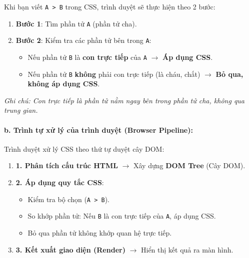 \documentclass[11pt,oneside]{book}
\newcommand{\codeinline}[1]{\textcolor{accentOrange}{\texttt{#1}}}
\newcommand{\term}[1]{\textbf{\textcolor{primaryBlue}{#1}}}
\begin{document}
\begin{noteBox}
Khi bạn viết \codeinline{A > B} trong CSS, trình duyệt sẽ thực hiện theo 2 bước:
\begin{enumerate}[leftmargin=1.5em, itemsep=3pt, parsep=0pt]
    \item \textbf{Bước 1}: Tìm phần tử \codeinline{A} (phần tử cha).
    \item \textbf{Bước 2}: Kiểm tra các phần tử bên trong \codeinline{A}:
    \begin{itemize}[leftmargin=1.2em, itemsep=2pt, parsep=0pt]
        \item Nếu phần tử \codeinline{B} là \textbf{con trực tiếp} của \codeinline{A} $\rightarrow$ \textcolor{tipBorder}{\textbf{Áp dụng CSS}}.
        \item Nếu phần tử \codeinline{B} \textbf{không} phải con trực tiếp (là cháu, chắt) $\rightarrow$ \textcolor{warnBorder}{\textbf{Bỏ qua, không áp dụng CSS}}.
    \end{itemize}
\end{enumerate}
\textit{Ghi chú: Con trực tiếp là phần tử nằm ngay bên trong phần tử cha, không qua trung gian.}
\end{noteBox}

\paragraph{b. Trình tự xử lý của trình duyệt (Browser Pipeline):}

\begin{conceptBox}
Trình duyệt xử lý CSS theo thứ tự duyệt cây DOM:
\begin{enumerate}[leftmargin=1.5em, itemsep=3pt, parsep=0pt]
    \item \textbf{1. Phân tích cấu trúc HTML} $\rightarrow$ Xây dựng \term{DOM Tree} (Cây DOM).
    \item \textbf{2. Áp dụng quy tắc CSS}:
    \begin{itemize}[leftmargin=1.2em, itemsep=2pt, parsep=0pt]
        \item Kiểm tra bộ chọn (\codeinline{A > B}).
        \item So khớp phần tử: Nếu \codeinline{B} là con trực tiếp của \codeinline{A}, áp dụng CSS.
        \item Bỏ qua phần tử không khớp quan hệ trực tiếp.
    \end{itemize}
    \item \textbf{3. Kết xuất giao diện (Render)} $\rightarrow$ Hiển thị kết quả ra màn hình.
\end{enumerate}
\end{conceptBox}
\end{document}
